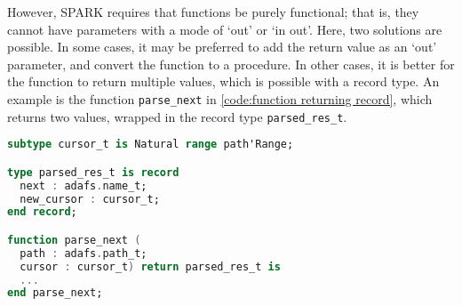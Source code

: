 However, SPARK requires that functions be purely functional; that is, they cannot have parameters with a mode of `out' or `in out'.
Here, two solutions are possible.
In some cases, it may be preferred to add the return value as an `out' parameter, and convert the function to a procedure.
In other cases, it is better for the function to return multiple values, which is possible with a record type.
An example is the function \lstinline{parse_next} in \autoref{code:function returning record}, which returns two values, wrapped in the record type \lstinline{parsed_res_t}.

\begin{lstlisting}[caption={Parse function returning the parsed component and the new cursor position}, label={code:function returning record}, language=Ada]
subtype cursor_t is Natural range path'Range;

type parsed_res_t is record
  next : adafs.name_t;
  new_cursor : cursor_t;
end record;

function parse_next (
  path : adafs.path_t;
  cursor : cursor_t) return parsed_res_t is
  ...
end parse_next;
\end{lstlisting}
